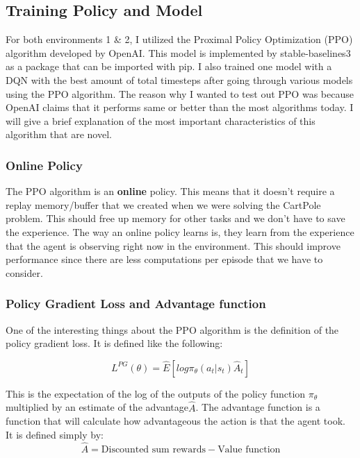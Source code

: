 \documentclass{article}
\numberwithin{equation}{section}
\numberwithin{equation}{section}
\begin{document}
\subsection*{Training Policy and Model}

For both environments 1 \& 2, I utilized the Proximal Policy Optimization (PPO) algorithm developed by OpenAI. This model is implemented by stable-baselines3 as a package that can be imported with pip. I also trained one model with a DQN with the best amount of total timesteps after going through various models using the PPO algorithm. The reason why I wanted to test out PPO was because OpenAI claims that it performs same or better than the most algorithms today. I will give a brief explanation of the most important characteristics of this algorithm that are novel.

\subsubsection*{Online Policy}
The PPO algorithm is an \textbf{online} policy. This means that it doesn't require a replay memory/buffer that we created when we were solving the CartPole problem. This should free up memory for other tasks and we don't have to save the experience. The way an online policy learns is, they learn from the experience that the agent is observing right now in the environment. This should improve performance since there are less computations per episode that we have to consider.  

\subsubsection*{Policy Gradient Loss and Advantage function}

One of the interesting things about the PPO algorithm is the definition of the policy gradient loss. It is defined like the following:

$$
L^{PG}(\theta) = \hat{E} \left[log \pi_{\theta}(a_t | s_t) \hat{A}_t \right]
$$

This is the expectation of the log of the outputs of the policy function $\pi_{\theta}$ multiplied by an estimate of the advantage$\hat{A}$. The advantage function is a function that will calculate how advantageous the action is that the agent took. It is defined simply by:
$$
\hat{A} = \textrm{Discounted sum rewards} - \textrm{Value function} 
$$
\end{document}
